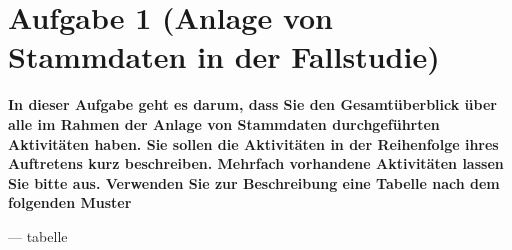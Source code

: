 \section{Aufgabe 1 (Anlage von Stammdaten in der Fallstudie)}
\textbf{In dieser Aufgabe geht es darum, dass Sie den Gesamtüberblick über alle im Rahmen der Anlage
von Stammdaten durchgeführten Aktivitäten haben. Sie sollen die Aktivitäten in der Reihenfolge
ihres Auftretens kurz beschreiben. Mehrfach vorhandene Aktivitäten lassen Sie bitte aus.
Verwenden Sie zur Beschreibung eine Tabelle nach dem folgenden Muster}

--- tabelle

\clearpage 